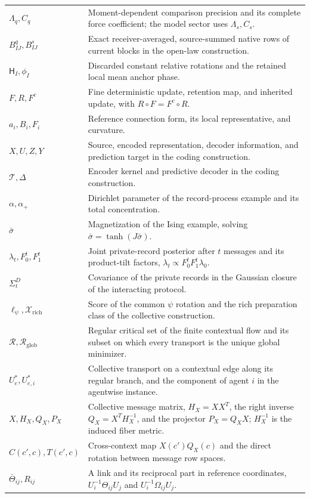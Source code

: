 \begin{longtable}{@{}p{}p{}@{}}
$\Lambda_q,C_q$ & Moment-dependent comparison precision and its complete force coefficient; the model sector uses $\Lambda_s,C_s$. \\
$B^q_{IJ},B^s_{IJ}$ & Exact receiver-averaged, source-summed native rows of current blocks in the open-law construction. \\
$\mathsf H_I,\phi_I$ & Discarded constant relative rotations and the retained local mean anchor phase. \\
$F,R,F^c$ & Fine deterministic update, retention map, and inherited update, with $R\circ F=F^c\circ R$. \\
$a_i,B_i,F_i$ & Reference connection form, its local representative, and curvature. \\
$X,U,Z,Y$ & Source, encoded representation, decoder information, and prediction target in the coding construction. \\
$\mathcal T,\Delta$ & Encoder kernel and predictive decoder in the coding construction. \\
$\alpha,\alpha_+$ & Dirichlet parameter of the record-process example and its total concentration. \\
$\bar\sigma$ & Magnetization of the Ising example, solving $\bar\sigma=\tanh(J\bar\sigma)$. \\
$\lambda_t,F_0^t,F_1^t$ & Joint private-record posterior after $t$ messages and its product-tilt factors, $\lambda_t\propto F_0^tF_1^t\lambda_0$. \\
$\Sigma^D_t$ & Covariance of the private records in the Gaussian closure of the interacting protocol. \\
$\ell_\psi,\mathcal X_{\mathrm{rich}}$ & Score of the common $\psi$ rotation and the rich preparation class of the collective construction. \\
$\mathcal R,\mathcal R_{\mathrm{glob}}$ & Regular critical set of the finite contextual flow and its subset on which every transport is the unique global minimizer. \\
$U^*_e,U^*_{e,i}$ & Collective transport on a contextual edge along its regular branch, and the component of agent $i$ in the agentwise instance. \\
$X,H_X,Q_X,P_X$ & Collective message matrix, $H_X=XX^T$, the right inverse $Q_X=X^TH_X^{-1}$, and the projector $P_X=Q_XX$; $H_X^{-1}$ is the induced fiber metric. \\
$C(c',c),T(c',c)$ & Cross-context map $X(c')Q_X(c)$ and the direct rotation between message row spaces. \\
$\bar\Theta_{ij},R_{ij}$ & A link and its reciprocal part in reference coordinates, $U_i^{-1}\Theta_{ij}U_j$ and $U_i^{-1}\Omega_{ij}U_j$. \\

\end{longtable}
